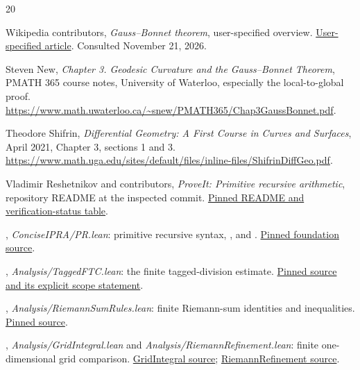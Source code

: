 \begin{thebibliography}{20}

Wikipedia contributors, \emph{Gauss--Bonnet theorem}, user-specified overview.
\href{https://en.wikipedia.org/wiki/Gauss%E2%80%93Bonnet_theorem}{User-specified article}.
Consulted November 21, 2026.

Steven New, \emph{Chapter 3. Geodesic Curvature and the Gauss--Bonnet Theorem}, PMATH 365 course notes, University of Waterloo, especially the local-to-global proof.
\url{https://www.math.uwaterloo.ca/~snew/PMATH365/Chap3GaussBonnet.pdf}.

Theodore Shifrin, \emph{Differential Geometry: A First Course in Curves and Surfaces}, April 2021, Chapter 3, sections 1 and 3.
\url{https://www.math.uga.edu/sites/default/files/inline-files/ShifrinDiffGeo.pdf}.

Vladimir Reshetnikov and contributors, \emph{ProveIt: Primitive recursive arithmetic}, repository README at the inspected commit.
\href{https://github.com/VladimirReshetnikov/ProveIt/blob/d36b35eed5bd01af4ade66bf539622495813ccc8/Logic/PrimitiveRecursiveArithmetic/README.md}{Pinned README and verification-status table}.

\repo, \emph{ConciseIPRA/PR.lean}: primitive recursive syntax, , and .
\href{https://github.com/VladimirReshetnikov/ProveIt/blob/d36b35eed5bd01af4ade66bf539622495813ccc8/Logic/PrimitiveRecursiveArithmetic/ConciseIPRA/Lean/ConciseIPRA/PR.lean}{Pinned foundation source}.

\repo, \emph{Analysis/TaggedFTC.lean}: the finite tagged-division estimate.
\href{https://github.com/VladimirReshetnikov/ProveIt/blob/d36b35eed5bd01af4ade66bf539622495813ccc8/Logic/PrimitiveRecursiveArithmetic/Derivations/Lean/IPRADerivations/Analysis/TaggedFTC.lean}{Pinned source and its explicit scope statement}.

\repo, \emph{Analysis/RiemannSumRules.lean}: finite Riemann-sum identities and inequalities.
\href{https://github.com/VladimirReshetnikov/ProveIt/blob/d36b35eed5bd01af4ade66bf539622495813ccc8/Logic/PrimitiveRecursiveArithmetic/Derivations/Lean/IPRADerivations/Analysis/RiemannSumRules.lean}{Pinned source}.

\repo, \emph{Analysis/GridIntegral.lean} and \emph{Analysis/RiemannRefinement.lean}: finite one-dimensional grid comparison.
\href{https://github.com/VladimirReshetnikov/ProveIt/blob/d36b35eed5bd01af4ade66bf539622495813ccc8/Logic/PrimitiveRecursiveArithmetic/Derivations/Lean/IPRADerivations/Analysis/GridIntegral.lean}{GridIntegral source};
\href{https://github.com/VladimirReshetnikov/ProveIt/blob/d36b35eed5bd01af4ade66bf539622495813ccc8/Logic/PrimitiveRecursiveArithmetic/Derivations/Lean/IPRADerivations/Analysis/RiemannRefinement.lean}{RiemannRefinement source}.


\end{thebibliography}
